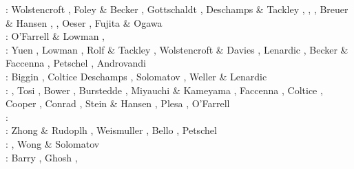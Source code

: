 \begin{scriptsize}
\twothousandnine: Wolstencroft \etal \cite{wodd09}, Foley \& Becker \cite{fobe09},
                  Gottschaldt \etal \cite{gows09}, Deschamps \& Tackley \cite{deta09},
                  \cite{onlj09}\cite{wazh09},
                  \cite{vavv09}, Breuer \& Hansen \cite{brha09},
                  \cite{scbs09b}, Oeser \etal \cite{oebm09},
                  Fujita \& Ogawa \cite{fuog09}\\
\twothousandten: O'Farrell \& Lowman \cite{oflo10}, \cite{bumb10}
                 \cite{detn10}\cite{yayh10}
                 \cite{nata10}\cite{hole10}
                 \cite{zhzl10}\cite{vayb10}
                 \cite{brmw10}\\
\twothousandeleven: Yuen \etal \cite{yutc11}, Lowman \cite{lowm11},
                    Rolf \& Tackley \cite{rota11}, Wolstencroft \& Davies \cite{woda11},
                    Lenardic \etal \cite{lemj11}, Becker \& Faccenna \cite{befa11},
                    Petschel \etal \cite{pewb11}, Androvandi \etal \cite{andl11}\\
\twothousandtwelve: Biggin \etal \cite{bisa12}, Coltice \etal \cite{cort12b}
                    Deschamps \etal \cite{deyt12}, Solomatov \cite{solo12}, 
                    Weller \& Lenardic \cite{wele12}\\
\twothousandthirteen: \cite{holj13}\cite{dadb13}, 
                      Tosi \etal \cite{toyd13}, Bower \etal \cite{bogs13a},
                      Burstedde \etal \cite{busa13}, Miyauchi \& Kameyama \cite{mika13},
                      Faccenna \etal \cite{fabc13}, Coltice \cite{cosr13},
                      Cooper \etal \cite{coml13}, Conrad \etal \cite{cost13},
                      Stein \& Hansen \cite{stha13}, Plesa \etal \cite{plth13},
                      O'Farrell \etal \cite{oflb13}\\
\twothousandfourteen: \cite{arfw14}\cite{helo14}\cite{crta14}\cite{flgw14}
                      \cite{roct14}\cite{cort14}\cite{becr14}
                      \cite{nata14}\cite{stha14}\cite{stlh14}\cite{ogaw14}\\
\twothousandfifteen: Zhong \& Rudoplh \cite{zhru15}, Weismuller \etal \cite{wegg15},
                     Bello \etal \cite{bect15}, Petschel \etal \cite{pesw15}\\
\twothousandsixteen: \cite{frbs16}\cite{sisc16}\cite{boba16}\cite{wele16}\cite{welm16}
                     \cite{vade16}\cite{chah16}, Wong \& Solomatov \cite{woso16b}\\
\twothousandseventeen: Barry \etal \cite{badw17}, Ghosh \etal \cite{ghts17}, 

\end{scriptsize}
